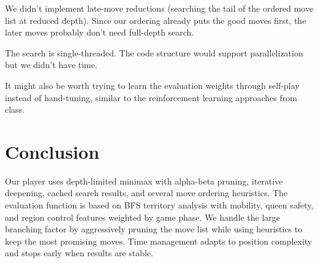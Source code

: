 \documentclass[12pt, letterpaper]{article}
\begin{document}
We didn't implement late-move reductions (searching the tail of the ordered move list at reduced depth). Since our ordering already puts the good moves first, the later moves probably don't need full-depth search.

The search is single-threaded. The code structure would support parallelization but we didn't have time.

It might also be worth trying to learn the evaluation weights through self-play instead of hand-tuning, similar to the reinforcement learning approaches from class.


\section{Conclusion}

Our player uses depth-limited minimax with alpha-beta pruning, iterative deepening, cached search results, and several move ordering heuristics. The evaluation function is based on BFS territory analysis with mobility, queen safety, and region control features weighted by game phase. We handle the large branching factor by aggressively pruning the move list while using heuristics to keep the most promising moves. Time management adapts to position complexity and stops early when results are stable.
\end{document}
